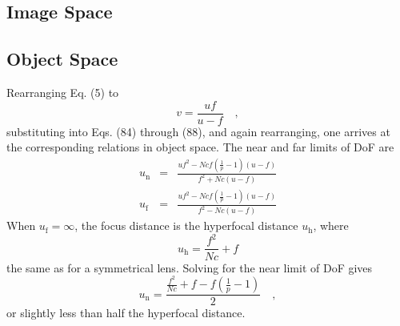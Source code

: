 \documentclass[11pt, oneside]{scrartcl}   	%
\begin{document}
\subsection{Image Space}


\subsection{Object Space}

Rearranging Eq. (5) to
\begin{equation}
  \label{eq:5v}
  v = \frac{uf}{u-f}\quad,
\end{equation}
%
substituting into Eqs. (84) through (88), and again rearranging, one
arrives at the corresponding relations in object space. The near and
far limits of DoF are
\begin{eqnarray}
     u_\mathrm{n} & = & \frac{uf^2-N\!cf\left(\frac1p-1\right)(u-f)}{f^2 + N\!c(u-f)}\label{eq:89}\\
     u_\mathrm{f} & = & \frac{uf^2-N\!cf\left(\frac1p-1\right)(u-f)}{f^2 - N\!c(u-f)}\label{eq:90}
\end{eqnarray}
When $u_\mathrm{f} = \infty$, the focus distance is the hyperfocal distance
$u_\mathrm{h}$, where
\begin{equation}
  \label{eq:uh2}
  u_\mathrm{h} = \frac{f^2}{N\!c} + f
\end{equation}
the same as for a symmetrical lens. Solving for the near limit of DoF
gives
\begin{equation}
  \label{eq:3un}
  u_\mathrm{n} = \frac{\frac{f^2}{N\!c} + f - f\left(\frac1p-1\right)}2\quad,
\end{equation}
or slightly less than half the hyperfocal distance.
\end{document}
